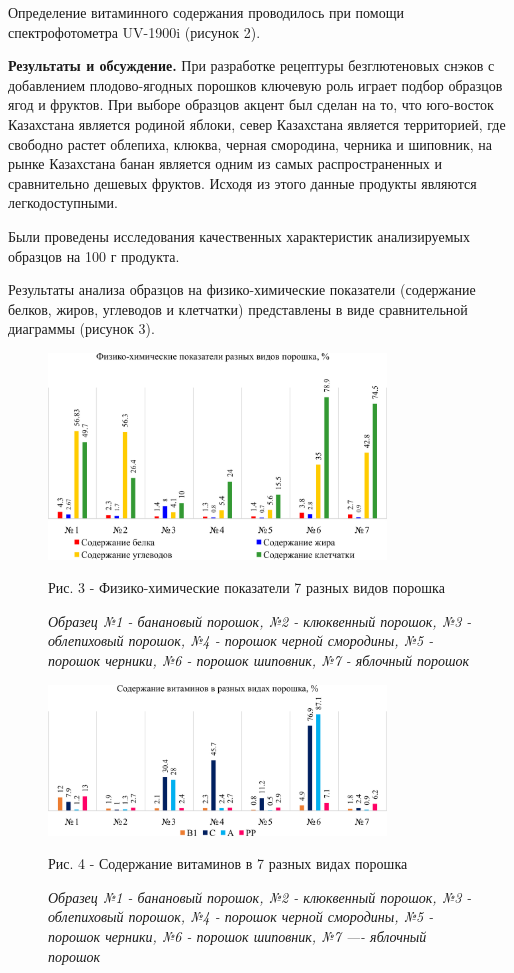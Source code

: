 \begin{multicols}{2}
Определение витаминного содержания проводилось при помощи
спектрофотометра UV-1900i (рисунок 2).

{\bfseries Результаты и обсуждение.} При разработке рецептуры безглютеновых
снэков с добавлением плодово-ягодных порошков ключевую роль играет
подбор образцов ягод и фруктов. При выборе образцов акцент был сделан на
то, что юго-восток Казахстана является родиной яблоки, север Казахстана
является территорией, где свободно растет облепиха, клюква, черная
смородина, черника и шиповник, на рынке Казахстана банан является одним
из самых распространенных и сравнительно дешевых фруктов. Исходя из
этого данные продукты являются легкодоступными.

Были проведены исследования качественных характеристик анализируемых
образцов на 100 г продукта.

Результаты анализа образцов на физико-химические показатели (содержание
белков, жиров, углеводов и клетчатки) представлены в виде сравнительной
диаграммы (рисунок 3).
\end{multicols}

\begin{figure}[H]
	\centering
	\includegraphics[width=0.8\textwidth]{media/pish/Graph_8}
	\caption*{Рис. 3 - Физико-химические показатели 7 разных видов порошка}
	\caption*{\normalfont \emph{Образец №1 - банановый порошок, №2 - клюквенный порошок, №3 -
облепиховый порошок, №4 - порошок черной смородины, №5 - порошок
черники, №6 - порошок шиповник, №7 - яблочный порошок}}
\end{figure}

\begin{figure}[H]
	\centering
	\includegraphics[width=0.8\textwidth]{media/pish/Graph_9}
	\caption*{Рис. 4 - Содержание витаминов в 7 разных видах порошка}
	\caption*{\normalfont \emph{Образец №1 - банановый порошок, №2 - клюквенный порошок, №3 -
облепиховый порошок, №4 - порошок черной смородины, №5 - порошок
черники, №6 - порошок шиповник, №7 ---\/- яблочный порошок}}
\end{figure}

